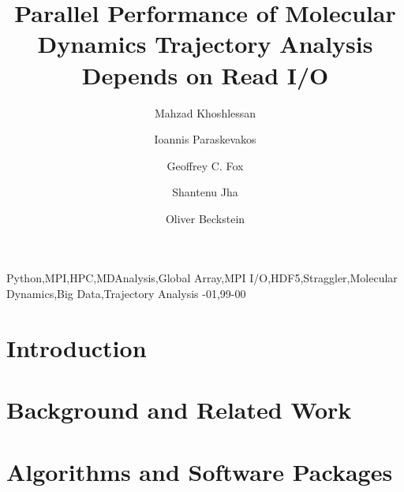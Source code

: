 \documentclass[review]{elsarticle}
\begin{document}
\begin{frontmatter}    

\title{Parallel Performance of Molecular Dynamics Trajectory Analysis Depends on Read I/O}

\author[ASUphysics]{Mahzad Khoshlessan}

\author[Rutgers]{Ioannis Paraskevakos}

\author[IndianaDSC]{Geoffrey C. Fox}

\author[Rutgers]{Shantenu Jha}

\author[ASUphysics,ASUCBP]{Oliver Beckstein}

\address[ASUphysics]{Department of Physics, Arizona State University,
  Tempe, AZ 85281, USA}
\address[ASUCBP]{Center for Biological Physics, Arizona State University,
  Tempe, AZ 85281, USA}
\address[Rutgers]{Department of Electrical \& Computer Engineering,
  Rutgers University, Piscataway, NJ 08854, USA}
\address[IndianaDSC]{Digital Science Center, Indiana University,
  Bloomington, IN 47405}

    


\begin{keyword}
Python\sep MPI\sep HPC\sep MDAnalysis\sep Global Array\sep MPI I/O\sep HDF5\sep Straggler\sep Molecular Dynamics\sep Big Data\sep Trajectory Analysis
-01\sep  99-00
\end{keyword}

\end{frontmatter}

\linenumbers

\section{Introduction}


\section{Background and Related Work}


\section{Algorithms and Software Packages}

\end{document}
